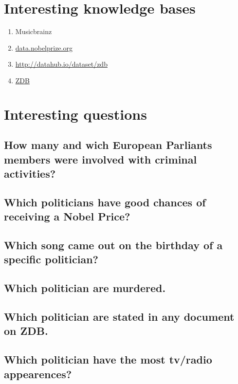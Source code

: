 \documentclass[11pt,a4paper]{article}
\begin{document}
\section{Interesting knowledge bases}
\begin{enumerate}

\item Musicbrainz
\item \url{data.nobelprize.org}
\item \url{http://datahub.io/dataset/zdb}
\item \url{ZDB}


\end{enumerate}
\section{Interesting questions}
\subsection{How many and wich European Parliants members were involved with criminal activities?}
\subsection{Which politicians have good chances of receiving a Nobel Price?}
\subsection{Which song came out on the birthday of a specific politician?}
\subsection{Which politician are murdered.}
\subsection{Which politician are stated in any document on ZDB.}
\subsection{Which politician have the most tv/radio appearences?}
\end{document}
